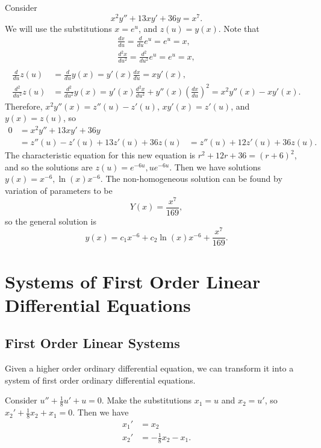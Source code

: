 \begin{exmp}
    Consider \[x^2y'' + 13xy' + 36y = x^7.\] We will use the substitutions $x = e^u$, and $z(u) = y(x)$.
    Note that
    \begin{align*}
        \frac{dx}{du} = \frac{d}{du}e^u = e^u = x, \\
        \frac{d^2x}{du^2} = \frac{d^2}{du^2}e^u = e^u = x, \\
    \end{align*}
    \begin{align*}
        \frac{d}{du}z(u) &= \frac{d}{du}y(x) = y'(x)\frac{dx}{du} = xy'(x), \\
        \frac{d^2}{du^2}z(u) &= \frac{d^2}{du^2}y(x) = y'(x)\frac{d^2x}{du^2} + y''(x)\left(\frac{dx}{du}\right)^2 = x^2y''(x) - xy'(x).
    \end{align*}
    Therefore, $x^2y''(x) = z''(u) - z'(u)$, $xy'(x) = z'(u)$, and $y(x) = z(u)$, so
    \begin{align*}
        0 &= x^2y'' + 13xy' + 36y \\
        &= z''(u) - z'(u) + 13z'(u) + 36z(u)
        &= z''(u) + 12z'(u) + 36z(u).
    \end{align*}
    The characteristic equation for this new equation is $r^2 + 12r + 36 = (r + 6)^2$, and so the solutions are $z(u) = e^{-6u}, ue^{-6u}$. Then we have solutions $y(x) = x^{-6}, \ln(x)x^{-6}$. The non-homogeneous solution can be found by variation of parameters to be
    \[Y(x) = \frac{x^7}{169},\]
    so the general solution is
    \[y(x) = c_1x^{-6} + c_2\ln(x)x^{-6} + \frac{x^7}{169}.\]
\end{exmp}

\section{Systems of First Order Linear Differential Equations}

\subsection{First Order Linear Systems}

\begin{rmk}
    Given a higher order ordinary differential equation, we can transform it into a system of first order ordinary differential equations.
\end{rmk}

\begin{exmp}
    Consider $u'' + \frac{1}{8}u' + u = 0$. Make the substitutions $x_1 = u$ and $x_2 = u'$, so $x_2' + \frac{1}{8}x_2 + x_1 = 0$. Then we have
    \begin{align*}
        x_1' &= x_2 \\
        x_2' &= -\frac{1}{8}x_2 - x_1.
    \end{align*}
\end{exmp}

